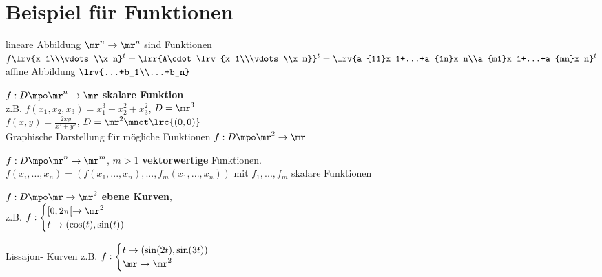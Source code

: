 \section{Beispiel für Funktionen}
		\item  lineare Abbildung $ \mr^n\rightarrow\mr^n $ sind Funktionen $ f\lrv{x_1\\\vdots\\x_n}^t=\lrr{A\cdot\lrv{x_1\\\vdots\\x_n}}^t=\lrv{a_{11}x_1+...+a_{1n}x_n\\a_{m1}x_1+...+a_{mn}x_n}^t$\\
		affine Abbildung $ \lrv{...+b_1\\...+b_n} $
		\item  $ f:D\mpo\mr^n\rightarrow\mr $ \textbf{skalare Funktion}\\
		z.B. $ f(x_1,x_2,x_3)=x_1^3+x_2^2+x_3^2 $, $ D=\mr^3 $\\
		$ f(x,y)=\frac{2xy}{x^2+y^2} $, $ D=\mr^2\mnot\lrc{(0,0)} $\\
		Graphische Darstellung für mögliche Funktionen $ f:D\mpo\mr^2\rightarrow\mr $
		
		
		\item  $ f:D\mpo\mr^n\rightarrow\mr^m $, $ m>1 $ \textbf{vektorwertige} Funktionen.\\
		$ f(x_i,...,x_n)=(f(x_1,...,x_n),...,f_m(x_1,...,x_n)) $ mit $ f_1,...,f_m $ skalare Funktionen
		
		\item $ f:D\mpo\mr\rightarrow\mr^2 $ \textbf{ebene Kurven},\\
		z.B. $ f:\begin{cases}[0,2\pi[\rightarrow\mr^2\\t\mapsto(\cos(t),\sin(t))\end{cases} $
		
		
		Lissajon- Kurven z.B. $ f:\begin{cases}t\rightarrow(\sin(2t),\sin(3t))\\\mr\rightarrow\mr^2\end{cases} $
		
